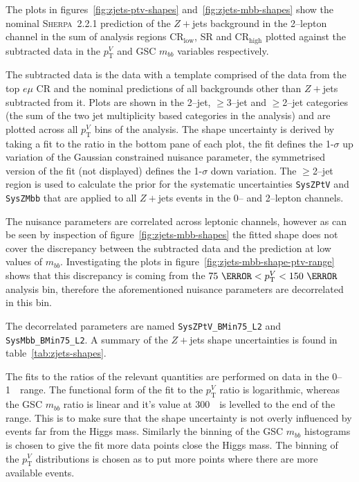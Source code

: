 The plots in figures~\ref{fig:zjets-ptv-shapes} and~\ref{fig:zjets-mbb-shapes}
show the nominal \textsc{Sherpa}~2.2.1 prediction of the $Z+$jets background in
the 2--lepton channel in the sum of analysis regions CR$_{\text{low}}$, SR and
CR$_{\text{high}}$ plotted against the subtracted data in the $p_{\mathrm{T}}^V$ and GSC
$m_{bb}$ variables respectively.


The subtracted data is the data with a template comprised of the data from the
top $e\mu$ CR and the nominal predictions of all backgrounds other than $Z+$jets
subtracted from it. Plots are shown in the 2--jet, $\geq$3--jet and $\geq$2--jet
categories (the sum of the two jet multiplicity based categories in the
analysis) and are plotted across all $p_{\mathrm{T}}^V$ bins of the analysis. The shape
uncertainty is derived by taking a fit to the ratio in the bottom pane of each
plot, the fit defines the 1-$\sigma$ up variation of the Gaussian constrained
nuisance parameter, the symmetrised version of the fit (not displayed) defines
the 1-$\sigma$ down variation. The $\geq$2--jet region is used to calculate the
prior for the systematic uncertainties \texttt{SysZPtV} and \texttt{SysZMbb}
that are applied to all $Z+$jets events in the 0-- and 2--lepton channels.

The nuisance parameters are correlated across leptonic channels, however as can
be seen by inspection of figure~\ref{fig:zjets-mbb-shapes} the fitted shape does
not cover the discrepancy between the subtracted data and the prediction at low
values of $m_{bb}$. Investigating the plots in
figure~\ref{fig:zjets-mbb-shape-ptv-range} shows that this discrepancy is coming
from the $75~\GeV < p_{\mathrm{T}}^V < 150~\GeV$ analysis bin, therefore the aforementioned
nuisance parameters are decorrelated in this bin.

The decorrelated parameters are named \texttt{SysZPtV\_BMin75\_L2} and
\texttt{SysMbb\_BMin75\_L2}. A summary of the $Z+$jets shape uncertainties is
found in table~\ref{tab:zjets-shapes}.


The fits to the ratios of the relevant quantities are performed on data in the
0--1~\TeV\ range. The functional form of the fit to the $ p_{\mathrm{T}}^V$
ratio is logarithmic, whereas the GSC $m_{bb}$ ratio is linear and it's value at
300~\GeV\ is levelled to the end of the range. This is to make sure that the
shape uncertainty is not overly influenced by events far from the Higgs mass.
Similarly the binning of the GSC $m_{bb}$ histograms is chosen to give the fit
more data points close the Higgs mass. The binning of the $p_{\mathrm{T}}^V$
distributions is chosen as to put more points where there are more available
events.

